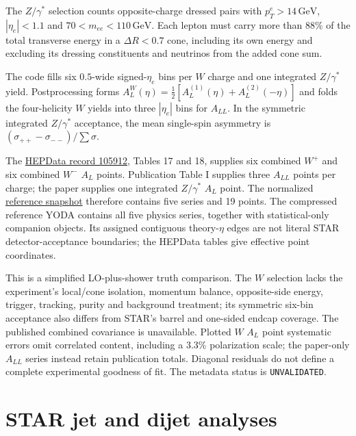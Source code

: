 \documentclass[11pt,a4paper]{article}
\newcommand{\GeV}{\mathrm{GeV}}
\newcommand{\repolink}[2]{\href{https://github.com/apapaefs/HerwigPolarizedPheno/blob/78d1be3962c3e058409634af28dc9cd52dc9b77d/#1}{#2}}
\begin{document}
\begin{description}
The $Z/\gamma^*$ selection counts opposite-charge dressed pairs with
$p_T^e>14\,\GeV$, $|\eta_e|<1.1$ and
$70<m_{ee}<110\,\GeV$. Each lepton must carry more than 88\% of the total
transverse energy in a $\Delta R<0.7$ cone, including its own energy and
excluding its dressing constituents and neutrinos from the added cone sum.
\item[Observables.]
The code fills six $0.5$-wide signed-$\eta_e$ bins per $W$ charge and one
integrated $Z/\gamma^*$ yield. Postprocessing forms
$A_L^W(\eta)=\tfrac12[A_L^{(1)}(\eta)+A_L^{(2)}(-\eta)]$ and folds the
four-helicity $W$ yields into three $|\eta_e|$ bins for $A_{LL}$.
In the symmetric integrated $Z/\gamma^*$ acceptance, the mean single-spin
asymmetry is $(\sigma_{++}-\sigma_{--})/\sum\sigma$.
\item[Reference data.]
The
\href{https://doi.org/10.17182/hepdata.105912.v1}{HEPData record 105912},
Tables 17 and 18, supplies six combined $W^+$ and six combined $W^-$
$A_L$ points. Publication Table I supplies three $A_{LL}$ points per charge;
the paper supplies one integrated $Z/\gamma^*$ $A_L$ point. The normalized
\repolink{data/phenomenology/STAR_2019_I1708793/reference.json}{reference snapshot}
therefore contains five series and 19 points. The compressed reference YODA
contains all five physics series, together with statistical-only companion
objects. Its assigned contiguous theory-$\eta$ edges are not literal STAR
detector-acceptance boundaries; the HEPData tables give effective point coordinates.
\item[Coverage and limitations.]
This is a simplified LO-plus-shower truth comparison. The $W$ selection lacks
the experiment's local/cone isolation, momentum balance, opposite-side energy,
trigger, tracking, purity and background treatment; its symmetric six-bin
acceptance also differs from STAR's barrel and one-sided endcap coverage.
The published combined covariance is unavailable. Plotted $W$ $A_L$ point
systematic errors omit correlated content, including a 3.3\% polarization
scale; the paper-only $A_{LL}$ series instead retain publication totals.
Diagonal residuals do not define a complete experimental goodness of fit.
The metadata status is \texttt{UNVALIDATED}.
\end{description}
\clearpage

\section{STAR jet and dijet analyses}
\end{document}
